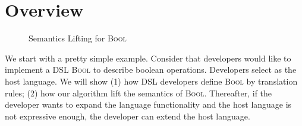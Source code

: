 \section{Overview}

\begin{figure}
  
  \caption{Semantics Lifting for \textsc{Bool}}
  \label{fig:bool-layer}
\end{figure}



We start with a pretty simple example.
Consider that developers would like to implement a DSL \textsc{Bool} to describe boolean operations.
Developers select \STLC{} as the host language.
We will show 
(1) how DSL developers define \textsc{Bool} by translation rules;
(2) how our algorithm lift the semantics of \textsc{Bool}.
Thereafter, if the developer wants to expand the language functionality
 and the host language is not expressive enough,
 the developer can extend the host language.



